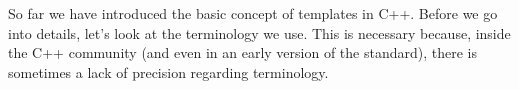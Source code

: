 So far we have introduced the basic concept of templates in C++. Before we go into details, let’s look at the terminology we use. This is necessary because, inside the C++ community (and even in an early version of the standard), there is sometimes a lack of precision regarding terminology.